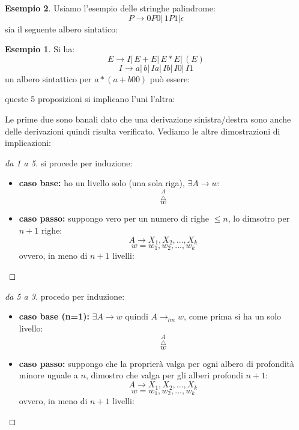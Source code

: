 \documentclass[a4paper]{book}
\theoremstyle{definition}%
\newtheorem*{esempio}{Esempio}
\begin{document}
  \begin{esempio}
Usiamo l'esempio delle stringhe palindrome:
$$P\to 0P0|\,1P1|\epsilon$$
sia il seguente albero sintatico:

\begin{esempio}
Si ha:
$$E\to I|\, E+E|\, E*E|\, (E)$$
$$I\to a|\,b|\,Ia|\,Ib|\,I0|\,I1$$
un albero sintattico per $a*(a+b00)$ può essere:



queste 5 proposizioni si implicano l'uni l'altra:
\begin{center}
\end{center}
Le prime due sono banali dato che una derivazione sinistra/destra sono anche delle derivazioni quindi risulta verificato.
Vediamo le altre dimostrazioni di implicazioni:
\begin{proof}[da 1 a 5]
si procede per induzione:
\begin{itemize}
\item \textbf{caso base:} ho un livello solo (una sola riga), $\exists A\to w$:
$$\overset{A}{\overset{\triangle}w}$$
\item \textbf{caso passo:} suppongo vero per un numero di righe $\leq n$, lo dimsotro per $n+1$ righe:
$$A\to X_1,X_2,...,X_k$$
$$w=w_1,w_2,...,w_k$$
ovvero, in meno di $n+1$ livelli:
\end{itemize}
\end{proof}
\begin{proof}[da 5 a 3]
procedo per induzione:
\begin{itemize}
\item \textbf{caso base (n=1): }$\exists A\to w\mbox{ quindi } A\to_{lm}w$, come prima si ha un solo livello:
$$\overset{A}{\overset{\triangle}w}$$
\item \textbf{caso passo: }suppongo che la proprierà valga per ogni albero di profondità minore uguale a $n$, dimostro che valga per gli alberi profondi $n+1$:
$$A\to X_1,X_2,...,X_k$$
$$w=w_1,w_2,...,w_k$$
ovvero, in meno di $n+1$ livelli:
\begin{center}


\end{center}
\end{itemize}
\end{proof}
\end{esempio}
\end{esempio}
\end{document}
